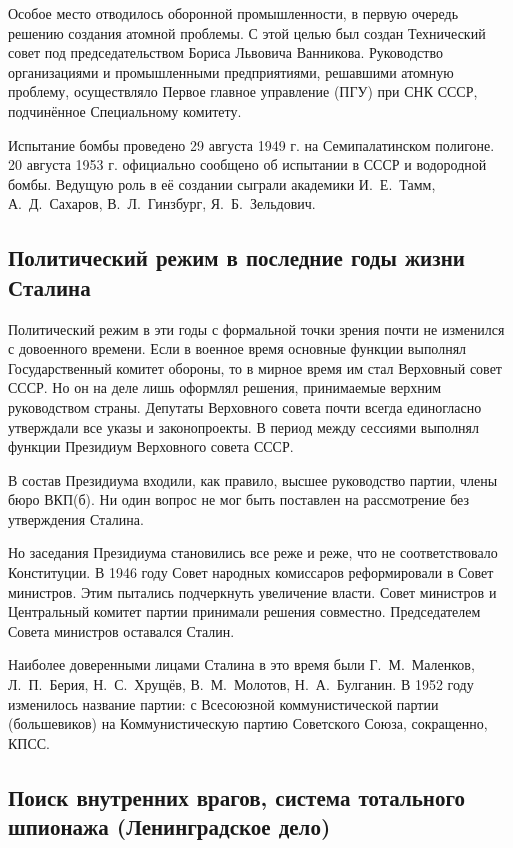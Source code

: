 Особое место отводилось оборонной промышленности, в первую очередь решению создания атомной проблемы. С этой целью был создан Технический совет под председательством Бориса Львовича Ванникова. Руководство организациями и промышленными предприятиями, решавшими атомную проблему, осуществляло Первое главное управление (ПГУ) при СНК СССР, подчинённое Специальному комитету.  

Испытание бомбы проведено 29 августа 1949 г. на Семипалатинском полигоне. 20 августа 1953 г. официально сообщено об испытании в СССР и водородной бомбы. Ведущую роль в её создании сыграли академики И.~Е.~Тамм, А.~Д.~Сахаров, В.~Л.~Гинзбург, Я.~Б.~Зельдович.

\subsection{Политический режим в последние годы жизни Сталина}

Политический режим в эти годы с формальной точки зрения почти не изменился с довоенного времени. Если в военное время основные функции выполнял Государственный комитет обороны, то в мирное время им стал Верховный совет СССР. Но он на деле лишь оформлял решения, принимаемые верхним руководством страны. Депутаты Верховного совета почти всегда единогласно утверждали все указы и законопроекты. В период между сессиями выполнял функции Президиум Верховного совета СССР. 

В состав Президиума входили, как правило, высшее руководство партии, члены бюро ВКП(б). Ни один вопрос не мог быть поставлен на рассмотрение без утверждения Сталина.

Но заседания Президиума становились все реже и реже, что не соответствовало Конституции. В 1946 году Совет народных комиссаров реформировали в Совет министров. Этим пытались подчеркнуть увеличение власти. Совет министров и Центральный комитет партии принимали решения совместно. Председателем Совета министров оставался Сталин.

Наиболее доверенными лицами Сталина в это время были Г.~М.~Маленков, Л.~П.~Берия, Н.~С.~Хрущёв, В.~М.~Молотов, Н.~А.~Булганин.
В 1952 году изменилось название партии: с Всесоюзной коммунистической партии (большевиков) на Коммунистическую партию Советского Союза, сокращенно, КПСС. 

\subsection{Поиск внутренних врагов, система тотального шпионажа (Ленинградское дело)}

